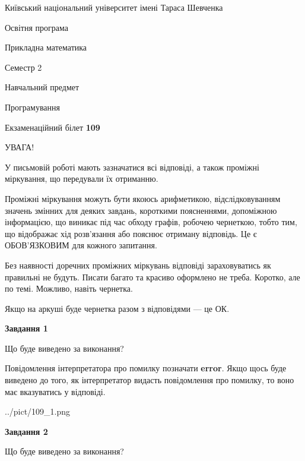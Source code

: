 \documentclass[12pt, ukrainian]{article}
\begin{document}
{{\begin {small}\par
{ \center  Київський національний університет імені Тараса Шевченка \par}
{\parbox {5 cm}{Освітня програма \hfill}{\parbox {7 cm}{Прикладна математика \hfill}}\parbox {6 cm}{\hfill Семестр 2}}\par
{\parbox {5 cm} {Навчальний предмет \hfill}\parbox {7 cm}{Програмування \hfill}\parbox {6cm}{\hfill}\par}\vspace{-7pt} \end{small}}{\center Екзаменаційний білет \No \textbf
{ 109 }\par}}
{
\begin {large}
УВАГА!

У письмовій роботі мають зазначатися всі відповіді, а також проміжні міркування, що передували їх отриманню.

Проміжні міркування можуть бути якоюсь арифметикою, відслідковуванням зна\-чень змінних для деяких завдань,
короткими поясненнями, допоміжною інформацією, що виникає під час обходу графів, робочею чернеткою,
тобто тим, що відображає хід розв’язання або пояснює отриману відповідь.
Це є ОБОВ’ЯЗКОВИМ для кожного запитання.

Без наявності доречних проміжних міркувань відповіді зараховуватись як правиль\-ні не будуть.
Писати багато та красиво оформлено не треба. Коротко, але по темі. Можли\-во, навіть чернетка.

Якщо на аркуші буде чернетка разом з відповідями --- це ОК.

\newpage

{\begin {center}\textbf{Завдання 1}\end {center}}\par
Що буде виведено за виконання?

Повідомлення інтерпретатора про помилку позначати \textbf{error}.
Якщо щось буде виведено до того, як інтерпретатор видасть повідомлення про помилку, 
то воно має вказуватись у відповіді. \par


\begin{center}
	{../pict/109_1.png}
\end{center}
\newpage

{\begin {center}\textbf{Завдання 2}\end {center}}\par
Що буде виведено за виконання?


\end{large}}
\end{document}
